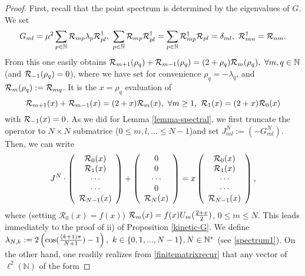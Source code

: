 \documentclass[a4paper,11pt,twoside]{article}
\numberwithin{equation}{section}
\theoremstyle{nonumberplain}
\newtheorem{proof}{Proof}
\begin{document}
\begin{proof}
First, recall that the point spectrum is determined by the eigenvalues of $G$. We set 
\begin{equation}
G_{ml}=\mu^2\sum_{p\in\mathbb{N}}{\cal{R}}_{mp}\lambda_p{\cal{R}}^\dag_{pl},\ \sum_{p\in\mathbb{N}}{\cal{R}}_{mp}{\cal{R}}^\dag_{pl}=\sum_{p\in\mathbb{N}}{\cal{R}}^\dag_{mp}{\cal{R}}_{pl}=\delta_{ml},\ {\cal{R}}^\dag_{mn}={\cal{R}}_{nm}\label{unitarytrans}.
\end{equation}
From this one easily obtains ${\cal{R}}_{m+1}(\rho_q)+{\cal{R}}_{m-1}(\rho_q)=(2+\rho_q){\cal{R}}_{m}(\rho_q),\ \forall m,q\in\mathbb{N}$ (and ${\cal{R}}_{-1}(\rho_q)=0$), where we have set for convenience $\rho_q=-\lambda_q$, and ${\cal{R}}_{m}(\rho_q):={\cal{R}}_{mq}$. It is the $x=\rho_q$ evaluation of
\begin{equation}
{\cal{R}}_{m+1}(x)+{\cal{R}}_{m-1}(x)=(2+x){\cal{R}}_{m}(x),\ \forall m\ge1,\ {\cal{R}}_1(x)=(2+x){\cal{R}}_0(x) \label{chebyshev-gene}
\end{equation}
with ${\cal{R}}_{-1}(x)=0$. As we did for Lemma \ref{lemma-spectral}, we first truncate the operator to $N\times N$ submatrice ($0\le m,l,...\le N-1$)and set $J^N_{ml}:=(-G^N_{ml})$. Then, we can write 
\begin{equation}
J^N\cdot \left(\begin{array}{c}
\mathcal{R}_0(x)\\
\mathcal{R}_1(x)\\ 
\cdots \\
\cdots \\
\mathcal{R}_{N-1}(x)
  \end{array}  \right) + \left(\begin{array}{c}
 0\\
0\\
\cdots \\ 
0 \\
{\cal{R}}_N(x)
  \end{array}  \right)=x\left(\begin{array}{c}
\mathcal{R}_0(x)\\
\mathcal{R}_1(x)\\ 
\cdots \\
\cdots \\
\mathcal{R}_{N-1}(x)
  \end{array}  \right)\label{finitematrixrecur},
\end{equation}
where (setting $\mathcal{R}_0(x)=f(x)$) ${\cal{R}}_m(x)=f(x)U_m({{2+x}\over{2}})$, $0\le m\le N$. This leads immediately to the proof of ii) of Proposition \ref{kinetic-G}. We define $\lambda_{N,k}:=2\left(\cos({{(k+1)\pi}\over{N+1}})-1\right), \ k\in\{0,1,...,N-1\}, N\in\mathbb{N}^*$ (see \eqref{spectrum1}). On the other hand, one readily realizes from \eqref{finitematrixrecur} that any vector of $\ell^2(\mathbb{N})$ of the form 

\end{proof}
\end{document}
